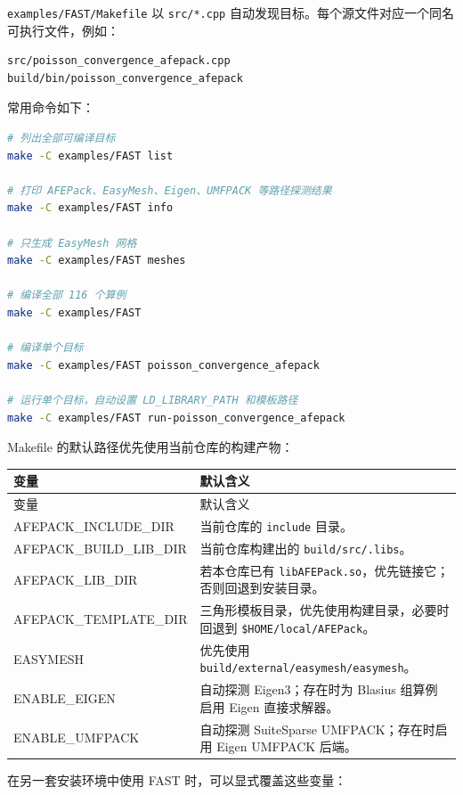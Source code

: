\documentclass[UTF8,openany,zihao=-4,scheme=chinese]{ctexbook}
\newcommand{\file}[1]{\nolinkurl{#1}}
\begin{document}
\file{examples/FAST/Makefile} 以 \file{src/*.cpp} 自动发现目标。每个源文件对应一个同名可执行文件，例如：

\begin{lstlisting}[language=bash]
src/poisson_convergence_afepack.cpp
build/bin/poisson_convergence_afepack
\end{lstlisting}

常用命令如下：

\begin{lstlisting}[language=bash]
# 列出全部可编译目标
make -C examples/FAST list

# 打印 AFEPack、EasyMesh、Eigen、UMFPACK 等路径探测结果
make -C examples/FAST info

# 只生成 EasyMesh 网格
make -C examples/FAST meshes

# 编译全部 116 个算例
make -C examples/FAST

# 编译单个目标
make -C examples/FAST poisson_convergence_afepack

# 运行单个目标，自动设置 LD_LIBRARY_PATH 和模板路径
make -C examples/FAST run-poisson_convergence_afepack
\end{lstlisting}

Makefile 的默认路径优先使用当前仓库的构建产物：

\begin{longtable}{>{\ttfamily}p{}p{}}
\toprule
变量 & 默认含义\\
\midrule
\endfirsthead
\toprule
变量 & 默认含义\\
\midrule
\endhead
AFEPACK\_INCLUDE\_DIR & 当前仓库的 \file{include} 目录。\\
AFEPACK\_BUILD\_LIB\_DIR & 当前仓库构建出的 \file{build/src/.libs}。\\
AFEPACK\_LIB\_DIR & 若本仓库已有 \file{libAFEPack.so}，优先链接它；否则回退到安装目录。\\
AFEPACK\_TEMPLATE\_DIR & 三角形模板目录，优先使用构建目录，必要时回退到 \file{\$HOME/local/AFEPack}。\\
EASYMESH & 优先使用 \file{build/external/easymesh/easymesh}。\\
ENABLE\_EIGEN & 自动探测 Eigen3；存在时为 Blasius 组算例启用 Eigen 直接求解器。\\
ENABLE\_UMFPACK & 自动探测 SuiteSparse UMFPACK；存在时启用 Eigen UMFPACK 后端。\\
\bottomrule
\end{longtable}

在另一套安装环境中使用 FAST 时，可以显式覆盖这些变量：
\end{document}
